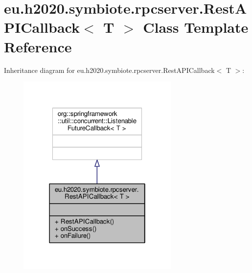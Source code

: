 \hypertarget{classeu_1_1h2020_1_1symbiote_1_1rpcserver_1_1RestAPICallback}{}\section{eu.\+h2020.\+symbiote.\+rpcserver.\+Rest\+A\+P\+I\+Callback$<$ T $>$ Class Template Reference}
\label{classeu_1_1h2020_1_1symbiote_1_1rpcserver_1_1RestAPICallback}


Inheritance diagram for eu.\+h2020.\+symbiote.\+rpcserver.\+Rest\+A\+P\+I\+Callback$<$ T $>$\+:
\nopagebreak
\begin{figure}[H]
\begin{center}
\leavevmode
\includegraphics[width=226pt]{classeu_1_1h2020_1_1symbiote_1_1rpcserver_1_1RestAPICallback__inherit__graph}
\end{center}
\end{figure}


